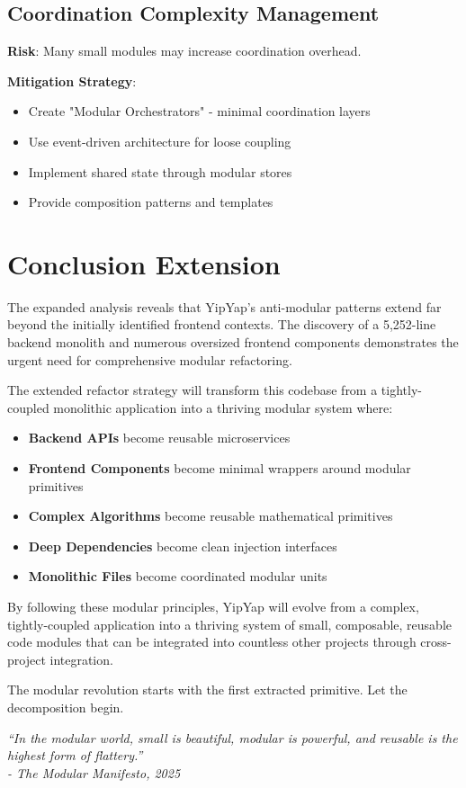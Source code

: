 \documentclass[11pt]{article}
\begin{document}
\subsection{Coordination Complexity Management}

\textbf{Risk}: Many small modules may increase coordination overhead.

\textbf{Mitigation Strategy}:
\begin{itemize}
\item Create "Modular Orchestrators" - minimal coordination layers
\item Use event-driven architecture for loose coupling
\item Implement shared state through modular stores
\item Provide composition patterns and templates
\end{itemize}

\section{Conclusion Extension}

The expanded analysis reveals that YipYap's anti-modular patterns extend far beyond the initially identified frontend contexts. The discovery of a 5,252-line backend monolith and numerous oversized frontend components demonstrates the urgent need for comprehensive modular refactoring.

The extended refactor strategy will transform this codebase from a tightly-coupled monolithic application into a thriving modular system where:

\begin{itemize}
\item \textbf{Backend APIs} become reusable microservices
\item \textbf{Frontend Components} become minimal wrappers around modular primitives  
\item \textbf{Complex Algorithms} become reusable mathematical primitives
\item \textbf{Deep Dependencies} become clean injection interfaces
\item \textbf{Monolithic Files} become coordinated modular units
\end{itemize}

By following these modular principles, YipYap will evolve from a complex, tightly-coupled application into a thriving system of small, composable, reusable code modules that can be integrated into countless other projects through cross-project integration.

The modular revolution starts with the first extracted primitive. Let the decomposition begin.

\vfill

\textit{``In the modular world, small is beautiful, modular is powerful, and reusable is the highest form of flattery.''} \\
\textit{- The Modular Manifesto, 2025}
\end{document}
